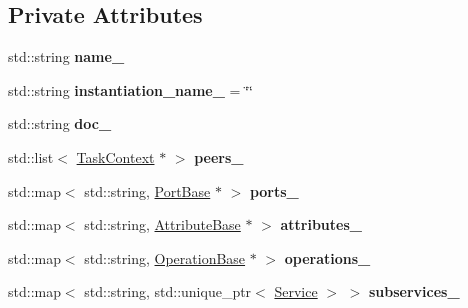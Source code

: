 \subsection*{Private Attributes}
\begin{DoxyCompactItemize}
\item 
\hypertarget{classcoco_1_1_service_ab7810b45fabd24c1283e094b8cddb0a9}{}std\+::string {\bfseries name\+\_\+}\label{classcoco_1_1_service_ab7810b45fabd24c1283e094b8cddb0a9}

\item 
\hypertarget{classcoco_1_1_service_a23cecfceac026295736fb1e86177346b}{}std\+::string {\bfseries instantiation\+\_\+name\+\_\+} = \char`\"{}\char`\"{}\label{classcoco_1_1_service_a23cecfceac026295736fb1e86177346b}

\item 
\hypertarget{classcoco_1_1_service_a18ce98161d3f88d130bab79a7219b202}{}std\+::string {\bfseries doc\+\_\+}\label{classcoco_1_1_service_a18ce98161d3f88d130bab79a7219b202}

\item 
\hypertarget{classcoco_1_1_service_a3a496756e69bdf85ead40b87ba4af448}{}std\+::list$<$ \hyperlink{classcoco_1_1_task_context}{Task\+Context} $\ast$ $>$ {\bfseries peers\+\_\+}\label{classcoco_1_1_service_a3a496756e69bdf85ead40b87ba4af448}

\item 
\hypertarget{classcoco_1_1_service_a548c23cff551beb95fd53232e8f2bc33}{}std\+::map$<$ std\+::string, \hyperlink{classcoco_1_1_port_base}{Port\+Base} $\ast$ $>$ {\bfseries ports\+\_\+}\label{classcoco_1_1_service_a548c23cff551beb95fd53232e8f2bc33}

\item 
\hypertarget{classcoco_1_1_service_ab2dde04a643254e7d7cf0f08368d2b8c}{}std\+::map$<$ std\+::string, \hyperlink{classcoco_1_1_attribute_base}{Attribute\+Base} $\ast$ $>$ {\bfseries attributes\+\_\+}\label{classcoco_1_1_service_ab2dde04a643254e7d7cf0f08368d2b8c}

\item 
\hypertarget{classcoco_1_1_service_a02f04c8c548979377ab3534347da00c0}{}std\+::map$<$ std\+::string, \hyperlink{classcoco_1_1_operation_base}{Operation\+Base} $\ast$ $>$ {\bfseries operations\+\_\+}\label{classcoco_1_1_service_a02f04c8c548979377ab3534347da00c0}

\item 
\hypertarget{classcoco_1_1_service_ac91c9c92152cff27cb5c72a7c402a37b}{}std\+::map$<$ std\+::string, std\+::unique\+\_\+ptr$<$ \hyperlink{classcoco_1_1_service}{Service} $>$ $>$ {\bfseries subservices\+\_\+}\label{classcoco_1_1_service_ac91c9c92152cff27cb5c72a7c402a37b}

\end{DoxyCompactItemize}
